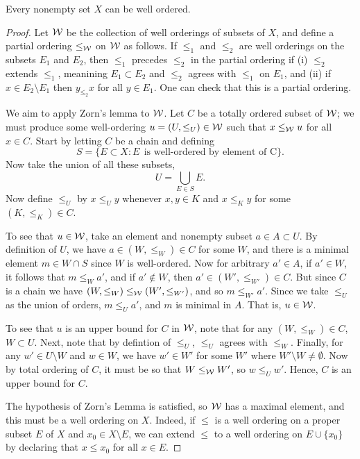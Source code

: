 \documentclass[12pt]{article} %
\begin{document}
\begin{principle}
    Every nonempty set $X$ can be well ordered.
\end{principle}

\begin{proof}
    Let $\mathcal{W}$ be the collection of well orderings of subsets of $X$, and define a partial ordering $\leq_{\mathcal{W}}$ on $\mathcal{W}$ as follows. If $\leq_1$ and $\leq_2$ are well orderings on the subsets $E_1$ and $E_2$, then $\leq_1$ precedes $\leq_2$ in the partial ordering if (i) $\leq_2$ extends $\leq_1$, meanining $E_1 \subset E_2$ and $\leq_2$ agrees with $\leq_1$ on $E_1$, and (ii) if $x \in E_2 \setminus E_1$ then $y_{\leq_2} x$ for all $y \in E_1$. One can check that this is a partial ordering.
    
    We aim to apply Zorn's lemma to $\mathcal{W}$. Let $C$ be a totally ordered subset of $\mathcal{W}$; we must produce some well-ordering $u = (U, \leq_U) \in \mathcal{W}$ such that $x \leq_{\mathcal{W}} u$ for all $x \in C$. Start by letting $C$ be a chain and defining \[S = \{E \subset X : E \ \ \text{is well-ordered by element of C}\}.\] Now take the union of all these subsets, \[U = \bigcup_{E \in S} E.\] Now define $\leq_U$ by $x \leq_U y$ whenever $x, y \in K$ and $x \leq_K y$ for some $(K, \leq_K) \in C$. 
    
    To see that $u \in \mathcal{W}$, take an element and nonempty subset $a \in A \subset U$. By definition of $U$, we have $a \in (W, \leq_W) \in C$ for some $W$, and there is a minimal element $m \in W \cap S$ since $W$ is well-ordered. Now for arbitrary $a' \in A$, if $a' \in W$, it follows that $m \leq_W a'$, and if $a' \notin W$, then $a' \in (W', \leq_{W'}) \in C$. But since $C$ is a chain we have $(W, \leq_W) \leq_{\mathcal{W}} (W', \leq_{W'})$, and so $m \leq_{W'} a'$. Since we take $\leq_U$ as the union of orders, $m \leq_U a'$, and $m$ is minimal in $A$. That is, $u \in \mathcal{W}$. 

    To see that $u$ is an upper bound for $C$ in $\mathcal{W}$, note that for any $(W, \leq_W) \in C$, $W \subset U$. Next, note that by defintion of $\leq_U$, $\leq_U$ agrees with $\leq_W$. Finally, for any $w' \in U \setminus W$ and $w \in W$, we have $w' \in W'$ for some $W'$ where $W' \setminus W \neq \emptyset$. Now by total ordering of $C$, it must be so that $W \leq_{\mathcal{W}} W'$, so $w \leq_U w'$. Hence, $C$ is an upper bound for $C$. 

    The hypothesis of Zorn's Lemma is satisfied, so $\mathcal{W}$ has a maximal element, and this must be a well ordering on $X$. Indeed, if $\leq$ is a well ordering on a proper subset $E$ of $X$ and $x_0 \in X \setminus E$, we can extend $\leq$ to a well ordering on $E \cup \{x_0\}$ by declaring that $x \leq x_0$ for all $x \in E$. 
\end{proof}
\end{document}

